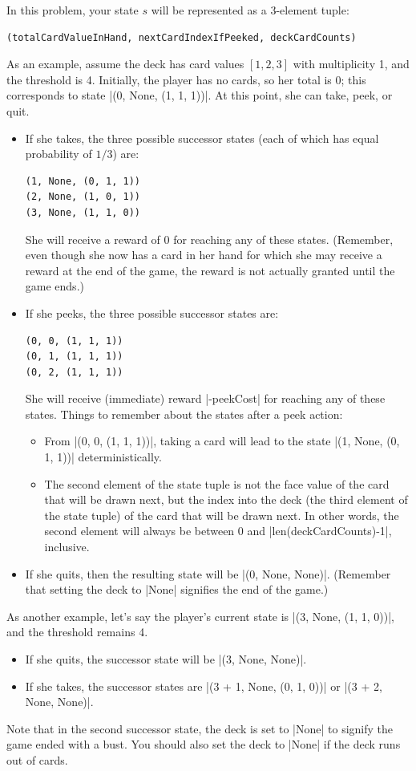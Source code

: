 In this problem, your state $s$ will be represented as a 3-element tuple:
\begin{lstlisting}  
(totalCardValueInHand, nextCardIndexIfPeeked, deckCardCounts)
\end{lstlisting}

As an example, assume the deck has card values $[1, 2, 3]$ with multiplicity 1,
and the threshold is 4. Initially, the player has no cards, so her total is 0;
this corresponds to state |(0, None, (1, 1, 1))|. At this point, she can take,
peek, or quit.
\begin{itemize}
  \item If she takes, the three possible successor states (each of which has
  equal probability of $1/3$) are:
\begin{lstlisting}
(1, None, (0, 1, 1))
(2, None, (1, 0, 1))
(3, None, (1, 1, 0))
\end{lstlisting}
  She will receive a reward of 0 for reaching any of these states.  (Remember,
  even though she now has a card in her hand for which she may receive a reward
  at the end of the game, the reward is not actually granted until the game
  ends.)
  \item If she peeks, the three possible successor states are:
\begin{lstlisting}
(0, 0, (1, 1, 1))
(0, 1, (1, 1, 1))
(0, 2, (1, 1, 1))
\end{lstlisting}
  She will receive (immediate) reward |-peekCost| for reaching any of these
  states. Things to remember about the states after a peek action:
  \begin{itemize}
    \item From |(0, 0, (1, 1, 1))|, taking a card will lead to the state |(1, None, (0, 1, 1))| deterministically.
    \item The second element of the state tuple is not the face value of the
    card that will be drawn next, but the index into the deck (the third element
    of the state tuple) of the card that will be drawn next.  In other words,
    the second element will always be between 0 and |len(deckCardCounts)-1|,
    inclusive.
  \end{itemize}
  \item If she quits, then the resulting state will be |(0, None, None)|.
  (Remember that setting the deck to |None| signifies the end of the game.)
\end{itemize}

As another example, let's say the player's current state is |(3, None, (1, 1, 0))|, and the threshold remains 4.
\begin{itemize}
  \item If she quits, the successor state will be |(3, None, None)|.
  \item If she takes, the successor states are |(3 + 1, None, (0, 1, 0))| or |(3 + 2, None, None)|.
\end{itemize}

Note that in the second successor state, the deck is set to |None| to signify
the game ended with a bust. You should also set the deck to |None| if the deck
runs out of cards.

\begin{enumerate}

  

  

\end{enumerate}
